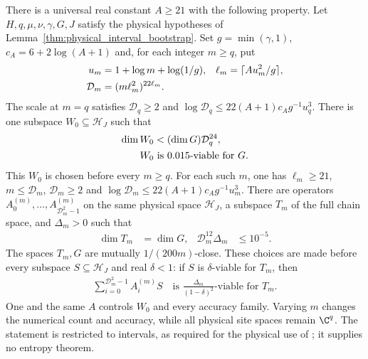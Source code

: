 \begin{lemma}
    \label{thm:physical_interval_all_accuracy_family}
    \leanok
    There is a universal real constant $A\ge21$ with the following property.
    Let $H,q,\mu,\nu,\gamma,G,J$ satisfy the physical hypotheses of
    Lemma~\ref{thm:physical_interval_bootstrap}. Set $g=\min(\gamma,1)$,
    $c_A=6+2\log(A+1)$ and, for each integer $m\ge q$, put
    \begin{align}
        u_m          & =1+\log m+\log(1/g),     & \ell_m & =\lceil Au_m^2/g\rceil,\notag \\
        \mathcal D_m & =(m\ell_m^2)^{22\ell_m}.
    \end{align}
    The scale at $m=q$ satisfies $\mathcal D_q\ge2$ and
    $\log\mathcal D_q\le22(A+1)c_Ag^{-1}u_q^3$.
    There is one subspace $W_0\subseteq\mathcal H_J$ such that
    \begin{align}
        \dim W_0 & <(\dim G)\mathcal D_q^{24},\notag     \\
        W_0      & \text{ is }0.015\text{-viable for }G.
    \end{align}
    This $W_0$ is chosen before every $m\ge q$.
    For each such $m$, one has $\ell_m\ge21$, $m\le\mathcal D_m$,
    $\mathcal D_m\ge2$ and
    $\log\mathcal D_m\le22(A+1)c_Ag^{-1}u_m^3$.
    There are operators $A^{(m)}_0,\ldots,A^{(m)}_{\mathcal D_m^2-1}$ on
    the same physical space $\mathcal H_J$, a subspace $T_m$ of the full
    chain space, and $\Delta_m>0$ such that
    \begin{align}
        \dim T_m & =\dim G, & \mathcal D_m^{12}\Delta_m & \le10^{-5}.
    \end{align}
    The spaces $T_m,G$ are mutually $1/(200m)$-close.
    These choices are made before every subspace $S\subseteq\mathcal H_J$
    and real $\delta<1$: if $S$ is $\delta$-viable for $T_m$, then
    \begin{align}
        \sum_{i=0}^{\mathcal D_m^2-1}A^{(m)}_iS
        \quad\text{is }\frac{\Delta_m}{(1-\delta)^2}\text{-viable for }T_m.
    \end{align}
    One and the same $A$ controls $W_0$ and every accuracy family.
    Varying $m$ changes the numerical count and accuracy, while all physical
    site spaces remain $\C^q$. The statement is restricted to intervals,
    as required for the physical use of
    \cite[Proposition 4.10]{Arad2016RigorousRG}; it supplies no entropy theorem.
\end{lemma}
